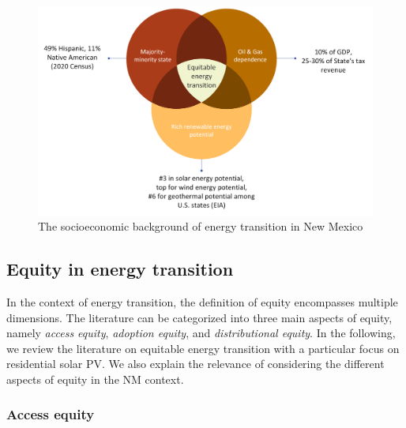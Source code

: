 \documentclass[11pt,twoside,letterpaper]{article}
\begin{document}
\begin{figure}[!ht]
    \centering
    \includegraphics[width=1\textwidth]{figures/nm_background.png}
    \caption{The socioeconomic background of energy transition in New Mexico}
    \label{fig:nm_background}
\end{figure}



\subsection{Equity in energy transition}
\label{section:equity}

In the context of energy transition, the definition of equity encompasses multiple dimensions. The literature can be categorized into three main aspects of equity, namely \textit{access equity}, \textit{adoption equity}, and \textit{distributional equity}. In the following, we review the literature on equitable energy transition with a particular focus on residential solar PV. We also explain the relevance of considering the different aspects of equity in the NM context.

\subsubsection{Access equity}
\end{document}

